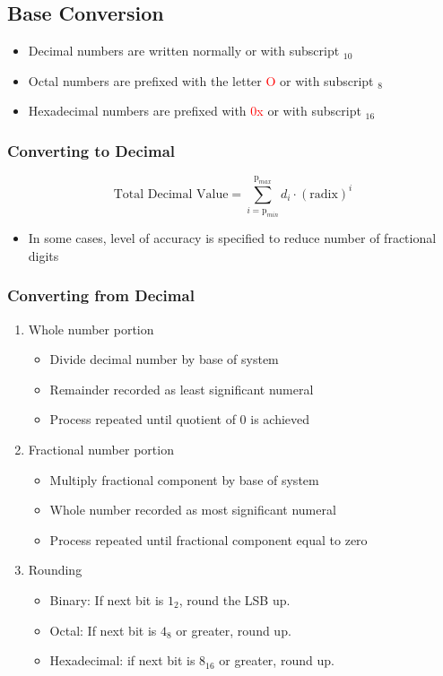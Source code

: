 \documentclass[a4paper]{article}
\begin{document}
\subsection{Base Conversion}
\begin{itemize}
    \item Decimal numbers are written normally or with subscript $_{10}$
    \item Octal numbers are prefixed with the letter \textcolor{red}{O} or with subscript $_8$
    \item Hexadecimal numbers are prefixed with \textcolor{red}{0x} or with subscript $_{16}$ 
\end{itemize}

\subsubsection{Converting to Decimal}
$$\text{Total Decimal Value} = \sum_{i=\text{p}_{min}}^{\text{p}_{max}}d_i\cdot(\text{radix})^i$$
\begin{itemize}
    \item In some cases, level of accuracy is specified to reduce number of fractional digits
\end{itemize}

\subsubsection{Converting from Decimal}
\begin{enumerate}
    \item Whole number portion
    \begin{itemize}[label=$\circ$]
        \item Divide decimal number by base of system
        \item Remainder recorded as least significant numeral
        \item Process repeated until quotient of 0 is achieved
    \end{itemize} 
    \newpage
    \item Fractional number portion
    \begin{itemize}[label=$\circ$]
        \item Multiply fractional component by base of system
        \item Whole number recorded as most significant numeral
        \item Process repeated until fractional component equal to zero
    \end{itemize}
    \item Rounding
    \begin{itemize}[label=$\circ$]
        \item Binary: If next bit is $1_2$, round the LSB up. 
        \item Octal: If next bit is $4_8$ or greater, round up.
        \item Hexadecimal: if next bit is $8_{16}$ or greater, round up.
    \end{itemize}
\end{enumerate}
\end{document}
